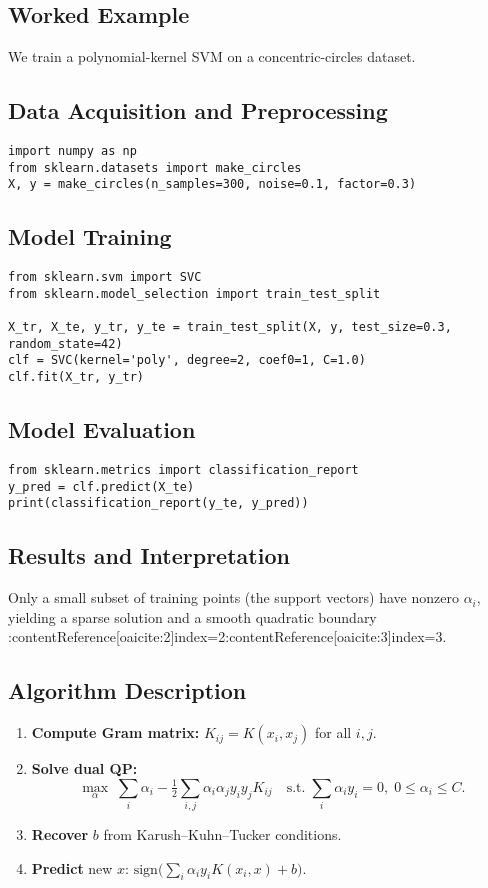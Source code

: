 \documentclass[11pt]{article}
\begin{document}
\subsection{Worked Example}
We train a polynomial-kernel SVM on a concentric-circles dataset.

\subsection{Data Acquisition and Preprocessing}
\begin{lstlisting}
import numpy as np
from sklearn.datasets import make_circles
X, y = make_circles(n_samples=300, noise=0.1, factor=0.3)
\end{lstlisting}

\subsection{Model Training}
\begin{lstlisting}
from sklearn.svm import SVC
from sklearn.model_selection import train_test_split

X_tr, X_te, y_tr, y_te = train_test_split(X, y, test_size=0.3, random_state=42)
clf = SVC(kernel='poly', degree=2, coef0=1, C=1.0)
clf.fit(X_tr, y_tr)
\end{lstlisting}

\subsection{Model Evaluation}
\begin{lstlisting}
from sklearn.metrics import classification_report
y_pred = clf.predict(X_te)
print(classification_report(y_te, y_pred))
\end{lstlisting}

\subsection{Results and Interpretation}
Only a small subset of training points (the support vectors) have nonzero $\alpha_i$, yielding a sparse solution and a smooth quadratic boundary :contentReference[oaicite:2]{index=2}:contentReference[oaicite:3]{index=3}.

\subsection{Algorithm Description}
\begin{enumerate}
  \item \textbf{Compute Gram matrix:} $K_{ij}=K(x_i,x_j)$ for all $i,j$.
  \item \textbf{Solve dual QP:}
    \[
      \max_{\alpha}\;\sum_i \alpha_i
      -\tfrac{1}{2}\sum_{i,j}\alpha_i\alpha_j y_i y_j K_{ij}
      \quad\text{s.t.}\;\sum_i \alpha_i y_i=0,\;0\le\alpha_i\le C.
    \]
  \item \textbf{Recover} $b$ from Karush–Kuhn–Tucker conditions.
  \item \textbf{Predict} new $x$: $\mathrm{sign}\bigl(\sum_i \alpha_i y_i K(x_i,x)+b\bigr)$.
\end{enumerate}
\end{document}
